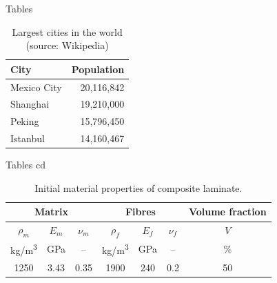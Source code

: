 \documentclass[10pt,aspectratio=169]{beamer} %
\begin{document}
\begin{frame}{Tables}
  \begin{table}
    \caption{Largest cities in the world (source: Wikipedia)}
    \begin{tabular}{lr}
      \toprule
      City & Population\\
      \midrule
      Mexico City & 20,116,842\\
      Shanghai & 19,210,000\\
      Peking & 15,796,450\\
      Istanbul & 14,160,467\\
      \bottomrule
    \end{tabular}
  \end{table}
\end{frame}
\begin{frame}{Tables cd}
\begin{table}
	\label{tab:mat_prop}
	\renewcommand{\arraystretch}{1.3}
	\centering \footnotesize
	\caption{Initial material properties of composite laminate.}
	\begin{tabular}{ccccccc} 
		\toprule
		\multicolumn{3}{c}{\textbf{Matrix} }	& \multicolumn{3}{c}{\textbf{Fibres} } & \textbf{Volume fraction}	 \\ 
		\midrule
		$\rho_m$ & $E_m$ & $\nu_m$  & $\rho_f$ & $E_f$ & $\nu_f$ & $V$\\
		kg/m\textsuperscript{3} &GPa& --  & kg/m\textsuperscript{3}  & GPa& -- & \%\\ 
		\cmidrule(lr){1-3} \cmidrule(lr){4-6} \cmidrule(lr){7-7}
		1250 &3.43& 0.35& 1900 & 240 & 0.2 & 50\\
		\bottomrule 
	\end{tabular} 
\end{table}
\end{frame}
\end{document}
